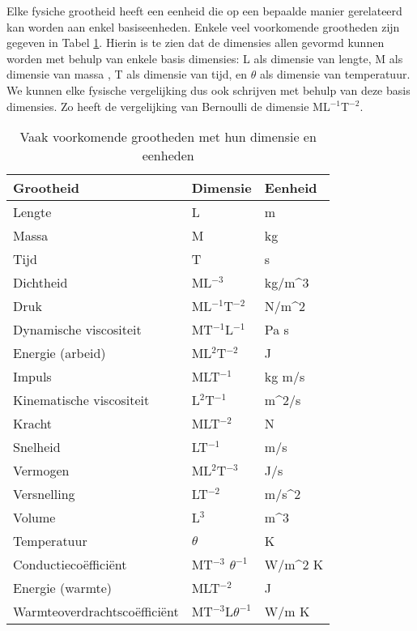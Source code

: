 Elke fysiche grootheid heeft een eenheid die op een bepaalde manier gerelateerd kan worden aan enkel basiseenheden. Enkele veel voorkomende grootheden zijn gegeven in Tabel \ref{tab:grootheden}. Hierin is te zien dat de dimensies allen gevormd kunnen worden met behulp van enkele basis dimensies: L als dimensie van lengte, M als dimensie van massa , T als dimensie van tijd, en $\theta$ als dimensie van temperatuur. We kunnen elke fysische vergelijking dus ook schrijven met behulp van deze basis dimensies. Zo heeft de vergelijking van Bernoulli de dimensie ML$^{-1}$T$^{-2}$.
\begin{table}[htb]
	\centering
	\begin{tabular}{lll}
		\hline
		Grootheid                   & Dimensie   & Eenheid \\
		\hline
		Lengte                       & L                          &  \unit{}{m} \\
		Massa                        & M                          &   \unit{}{kg} \\
		Tijd                         & T                          &   \unit{}{s} \\
		Dichtheid                    & ML$^{-3}$                  &   \unit{}{kg/m^3} \\
		Druk                         & ML$^{-1}$T$^{-2}$          &   \unit{}{N/m^2} \\	
		Dynamische viscositeit       & MT$^{-1}$L$^{-1}$          &   \unit{}{Pa s} \\
		Energie (arbeid)             & ML$^{2}$T$^{-2}$           &   \unit{}{J} \\
		Impuls                       & MLT$^{-1}$                 &   \unit{}{kg m/s} \\
		Kinematische viscositeit     & L$^{2}$T$^{-1}$            &   \unit{}{m^2/s} \\
		Kracht                       & MLT$^{-2}$                 &   \unit{}{N} \\
		Snelheid                     & LT$^{-1}$                  &   \unit{}{m/s} \\
		Vermogen                     & ML$^{2}$T$^{-3}$           &   \unit{}{J/s} \\
		Versnelling                  & LT$^{-2}$                  &   \unit{}{m/s^2} \\
		Volume                       & L$^3$                      &   \unit{}{m^3} \\
		Temperatuur                  & $\theta$                   &   \unit{}{K} \\
		Conductiecoëfficiënt         & MT$^{-3}$ $\theta^{-1}$    &   \unit{}{W/m^2 K} \\	
		Energie (warmte)             & MLT$^{-2}$                 &   \unit{}{J} \\
		Warmteoverdrachtscoëfficiënt & MT$^{-3}$L$\theta^{-1}$    &   \unit{}{W/m K} \\
		\hline
	\end{tabular}
	\caption{Vaak voorkomende grootheden met hun dimensie en eenheden}
	\label{tab:grootheden}
\end{table}

